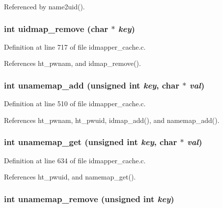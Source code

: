 Referenced by name2uid().
\subsubsection{\setlength{\rightskip}{0pt plus 5cm}int uidmap\_\-remove (char $\ast$ {\em key})}\label{idmapper__cache_8c_a33}




Definition at line 717 of file idmapper\_\-cache.c.

References ht\_\-pwnam, and idmap\_\-remove().
\subsubsection{\setlength{\rightskip}{0pt plus 5cm}int unamemap\_\-add (unsigned int {\em key}, char $\ast$ {\em val})}\label{idmapper__cache_8c_a22}




Definition at line 510 of file idmapper\_\-cache.c.

References ht\_\-pwnam, ht\_\-pwuid, idmap\_\-add(), and namemap\_\-add().
\subsubsection{\setlength{\rightskip}{0pt plus 5cm}int unamemap\_\-get (unsigned int {\em key}, char $\ast$ {\em val})}\label{idmapper__cache_8c_a28}




Definition at line 634 of file idmapper\_\-cache.c.

References ht\_\-pwuid, and namemap\_\-get().
\subsubsection{\setlength{\rightskip}{0pt plus 5cm}int unamemap\_\-remove (unsigned int {\em key})}\label{idmapper__cache_8c_a34}




